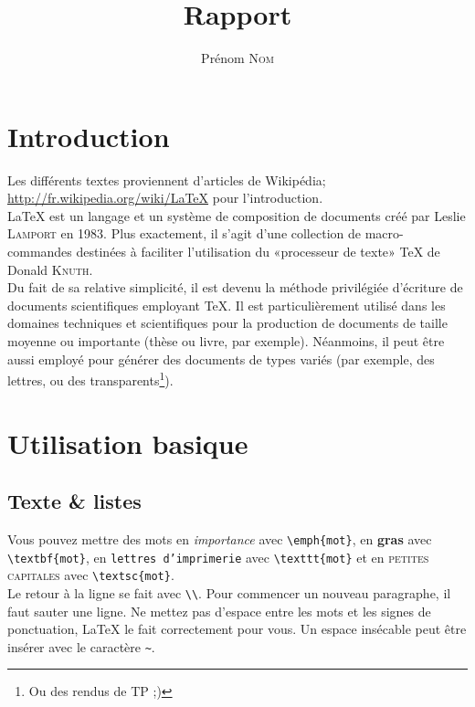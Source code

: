 \documentclass[a4paper]{article}
\title{Rapport}
\author{Prénom \textsc{Nom}}
\begin{document}
	\maketitle

	\tableofcontents

	\section*{Introduction}

		Les différents textes proviennent d'articles de Wikipédia; \url{http://fr.wikipedia.org/wiki/LaTeX} pour l'introduction. \\
		
		\LaTeX{} est un langage et un système de composition de documents créé par Leslie \textsc{Lamport} en 1983. Plus exactement, il s'agit d'une collection de macro-commandes destinées à faciliter l'utilisation du «processeur de texte» TeX de Donald \textsc{Knuth}. \\

		Du fait de sa relative simplicité, il est devenu la méthode privilégiée d'écriture de documents scientifiques employant TeX. Il est particulièrement utilisé dans les domaines techniques et scientifiques pour la production de documents de taille moyenne ou importante (thèse ou livre, par exemple). Néanmoins, il peut être aussi employé pour générer des documents de types variés (par exemple, des lettres, ou des transparents\footnote{Ou des rendus de TP ;)}).
		

	\section{Utilisation basique}

		\subsection{Texte \& listes}

			Vous pouvez mettre des mots en \emph{importance} avec \verb$\emph{mot}$, en \textbf{gras} avec \verb$\textbf{mot}$, en \texttt{lettres d'imprimerie} avec \verb$\texttt{mot}$ et en \textsc{petites capitales} avec \verb$\textsc{mot}$. \\

			Le retour à la ligne se fait avec \verb$\\$. Pour commencer un nouveau paragraphe, il faut sauter une ligne. Ne mettez pas d'espace entre les mots et les signes de ponctuation, \LaTeX{} le fait correctement pour vous. Un espace insécable peut être insérer avec le caractère \verb$~$. \\
			
\end{document}
